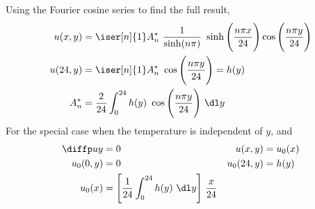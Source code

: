 \begin{enumerate}
          Using the Fourier cosine series to find the full result,
          \begin{align}
              u(x, y)  & = \iser[n]{1} A_n^*\ \frac{1}{\sinh(n\pi)}
              \ \sinh\Bigg( \frac{n\pi x}{24} \Bigg) \cos\Bigg( \frac{n\pi y}{24}
              \Bigg)                                                       \\
              u(24, y) & = \iser[n]{1} A_n^*\ \cos\Bigg( \frac{n\pi y}{24}
              \Bigg) = h(y)                                                \\
              A_n^*    & = \frac{2}{24} \int_{0}^{24} h(y)\ \cos\Bigg(
              \frac{n\pi y}{24} \Bigg)\ \dl y
          \end{align}
          For the special case when the temperature is independent of $ y $, and
          \begin{align}
              \diffp uy  & = 0                                                  &
              u(x, y)    & = u_0(x)                                               \\
              u_0(0, y)  & = 0                                                  &
              u_0(24, y) & = h(y)                                                 \\
              u_0(x)     & = \Bigg[\frac{1}{24} \int_{0}^{24} h(y)\ \dl y\Bigg]
              \ \frac{x}{24}
          \end{align}


\end{enumerate}
